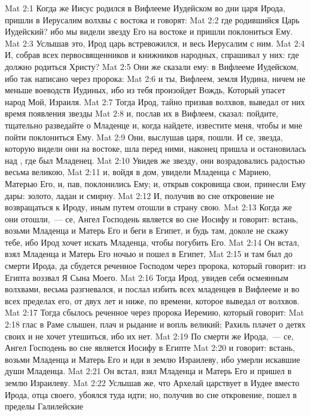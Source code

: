 \vs Mat 2:1 Когда же Иисус родился в Вифлееме Иудейском во дни царя Ирода, пришли в Иерусалим волхвы с востока и говорят:
\vs Mat 2:2 где родившийся Царь Иудейский? ибо мы видели звезду Его на востоке и пришли поклониться Ему.
\vs Mat 2:3 Услышав это, Ирод царь встревожился, и весь Иерусалим с ним.
\vs Mat 2:4 И, собрав всех первосвященников и книжников народных, спрашивал у них: где должно родиться Христу?
\vs Mat 2:5 Они же сказали ему: в Вифлееме Иудейском, ибо так написано через пророка:
\vs Mat 2:6 и ты, Вифлеем, земля Иудина, ничем не меньше воеводств Иудиных, ибо из тебя произойдет Вождь, Который упасет народ Мой, Израиля.
\vs Mat 2:7 Тогда Ирод, тайно призвав волхвов, выведал от них время появления звезды
\vs Mat 2:8 и, послав их в Вифлеем, сказал: пойдите, тщательно разведайте о Младенце и, когда найдете, известите меня, чтобы и мне пойти поклониться Ему.
\vs Mat 2:9 Они, выслушав царя, пошли. И се, звезда, которую видели они на востоке, шла перед ними,  наконец пришла и остановилась над , где был Младенец.
\vs Mat 2:10 Увидев же звезду, они возрадовались радостью весьма великою,
\vs Mat 2:11 и, войдя в дом, увидели Младенца с Мариею, Матерью Его, и, пав, поклонились Ему; и, открыв сокровища свои, принесли Ему дары: золото, ладан и смирну.
\vs Mat 2:12 И, получив во сне откровение не возвращаться к Ироду, иным путем отошли в страну свою.
\rsbpar\vs Mat 2:13 Когда же они отошли,~--- се, Ангел Господень является во сне Иосифу и говорит: встань, возьми Младенца и Матерь Его и беги в Египет, и будь там, доколе не скажу тебе, ибо Ирод хочет искать Младенца, чтобы погубить Его.
\vs Mat 2:14 Он встал, взял Младенца и Матерь Его ночью и пошел в Египет,
\vs Mat 2:15 и там был до смерти Ирода, да сбудется реченное Господом через пророка, который говорит: из Египта воззвал Я Сына Моего.
\rsbpar\vs Mat 2:16 Тогда Ирод, увидев себя осмеянным волхвами, весьма разгневался, и послал избить всех младенцев в Вифлееме и во всех пределах его, от двух лет и ниже, по времени, которое выведал от волхвов.
\vs Mat 2:17 Тогда сбылось реченное через пророка Иеремию, который говорит:
\vs Mat 2:18 глас в Раме слышен, плач и рыдание и вопль великий; Рахиль плачет о детях своих и не хочет утешиться, ибо их нет.
\rsbpar\vs Mat 2:19 По смерти же Ирода,~--- се, Ангел Господень во сне является Иосифу в Египте
\vs Mat 2:20 и говорит: встань, возьми Младенца и Матерь Его и иди в землю Израилеву, ибо умерли искавшие души Младенца.
\vs Mat 2:21 Он встал, взял Младенца и Матерь Его и пришел в землю Израилеву.
\vs Mat 2:22 Услышав же, что Архелай царствует в Иудее вместо Ирода, отца своего, убоялся туда идти; но, получив во сне откровение, пошел в пределы Галилейские
